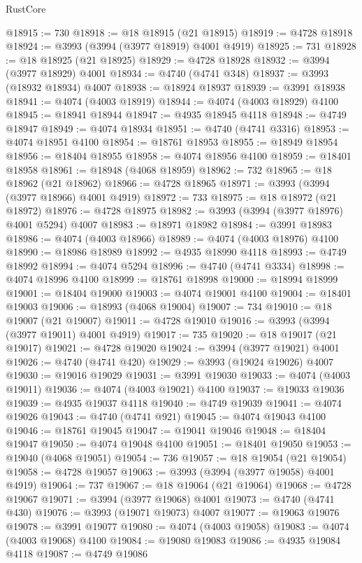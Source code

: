\begin{lexlean}{RustCore}
\begin{coremodule}
@18915 := 730
@18918 := @18 @18915 (@21 @18915)
@18919 := @4728 @18918
@18924 := @3993 (@3994 (@3977 @18919) @4001 @4919)
@18925 := 731
@18928 := @18 @18925 (@21 @18925)
@18929 := @4728 @18928
@18932 := @3994 (@3977 @18929) @4001
@18934 := @4740 (@4741 @348)
@18937 := @3993 (@18932 @18934) @4007
@18938 := @18924 @18937
@18939 := @3991 @18938
@18941 := @4074 (@4003 @18919)
@18944 := @4074 (@4003 @18929) @4100
@18945 := @18941 @18944
@18947 := @4935 @18945 @4118
@18948 := @4749 @18947
@18949 := @4074 @18934
@18951 := @4740 (@4741 @3316)
@18953 := @4074 @18951 @4100
@18954 := @18761 @18953
@18955 := @18949 @18954
@18956 := @18404 @18955
@18958 := @4074 @18956 @4100
@18959 := @18401 @18958
@18961 := @18948 (@4068 @18959)
@18962 := 732
@18965 := @18 @18962 (@21 @18962)
@18966 := @4728 @18965
@18971 := @3993 (@3994 (@3977 @18966) @4001 @4919)
@18972 := 733
@18975 := @18 @18972 (@21 @18972)
@18976 := @4728 @18975
@18982 := @3993 (@3994 (@3977 @18976) @4001 @5294) @4007
@18983 := @18971 @18982
@18984 := @3991 @18983
@18986 := @4074 (@4003 @18966)
@18989 := @4074 (@4003 @18976) @4100
@18990 := @18986 @18989
@18992 := @4935 @18990 @4118
@18993 := @4749 @18992
@18994 := @4074 @5294
@18996 := @4740 (@4741 @3334)
@18998 := @4074 @18996 @4100
@18999 := @18761 @18998
@19000 := @18994 @18999
@19001 := @18404 @19000
@19003 := @4074 @19001 @4100
@19004 := @18401 @19003
@19006 := @18993 (@4068 @19004)
@19007 := 734
@19010 := @18 @19007 (@21 @19007)
@19011 := @4728 @19010
@19016 := @3993 (@3994 (@3977 @19011) @4001 @4919)
@19017 := 735
@19020 := @18 @19017 (@21 @19017)
@19021 := @4728 @19020
@19024 := @3994 (@3977 @19021) @4001
@19026 := @4740 (@4741 @420)
@19029 := @3993 (@19024 @19026) @4007
@19030 := @19016 @19029
@19031 := @3991 @19030
@19033 := @4074 (@4003 @19011)
@19036 := @4074 (@4003 @19021) @4100
@19037 := @19033 @19036
@19039 := @4935 @19037 @4118
@19040 := @4749 @19039
@19041 := @4074 @19026
@19043 := @4740 (@4741 @921)
@19045 := @4074 @19043 @4100
@19046 := @18761 @19045
@19047 := @19041 @19046
@19048 := @18404 @19047
@19050 := @4074 @19048 @4100
@19051 := @18401 @19050
@19053 := @19040 (@4068 @19051)
@19054 := 736
@19057 := @18 @19054 (@21 @19054)
@19058 := @4728 @19057
@19063 := @3993 (@3994 (@3977 @19058) @4001 @4919)
@19064 := 737
@19067 := @18 @19064 (@21 @19064)
@19068 := @4728 @19067
@19071 := @3994 (@3977 @19068) @4001
@19073 := @4740 (@4741 @430)
@19076 := @3993 (@19071 @19073) @4007
@19077 := @19063 @19076
@19078 := @3991 @19077
@19080 := @4074 (@4003 @19058)
@19083 := @4074 (@4003 @19068) @4100
@19084 := @19080 @19083
@19086 := @4935 @19084 @4118
@19087 := @4749 @19086

\end{coremodule}
\end{lexlean}

